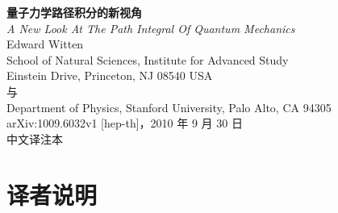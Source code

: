 \documentclass[11pt,a4paper,UTF8]{ctexart}
\theoremstyle{plain}
\theoremstyle{definition}
\begin{document}
\sloppy

\begin{center}
  {\LARGE\bfseries 量子力学路径积分的新视角}\\[8pt]
  {\large\itshape A New Look At The Path Integral Of Quantum Mechanics}\\[20pt]
  {\large Edward Witten}\\[8pt]
  {\small School of Natural Sciences, Institute for Advanced Study\\
   Einstein Drive, Princeton, NJ 08540 USA\\
   与\\
   Department of Physics, Stanford University, Palo Alto, CA 94305}\\[16pt]
  {\small arXiv:1009.6032v1 [hep-th]，2010 年 9 月 30 日\\[2pt]
   中文译注本}
\end{center}
\vspace{6pt}

\begin{abstract}
\noindent
本文将普通量子力学的费曼路径积分复化，并证明：这一复化积分的可能积分围道，与二维
A-模型中的膜（brane）相关联。这为 A-模型与量子力学之间的关系提供了一个相当直接的
解释；过去若干年中，人们已从多种视角研究过这一关系。这些现象在三维陈--西蒙斯
（Chern--Simons）规范理论中有其类比：该理论路径积分中的积分围道，可以由四维
$\mathcal{N}=4$ 超杨--米尔斯（super Yang--Mills）理论导出。因此，在一定条件下，
三维的陈--西蒙斯路径积分等价于四维的 $\mathcal{N}=4$ 路径积分。
\end{abstract}

\section*{译者说明}
\end{document}
